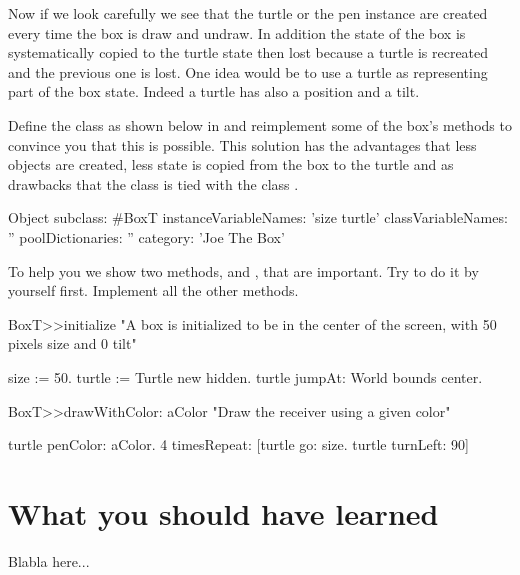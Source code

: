 Now if we look carefully we see that the turtle or the pen instance
are created every time the box is draw and undraw.  In addition the
state of the box is systematically copied to the turtle state then
lost because a turtle is recreated and the previous one is lost.  One
idea would be to use a turtle as representing part of the box state.
Indeed a turtle has also a position and a tilt.  

Define the class  as shown below in
 and reimplement some of the box's
methods to convince you that this is possible. This solution has the
advantages that less objects are created, less state is copied from
the box to the turtle and as drawbacks that the class  is tied
with the class .

\begin{classdef}\label{cls:alternateBoxDefinition}
Object subclass: #BoxT
   instanceVariableNames: 'size turtle'
   classVariableNames: ''
   poolDictionaries: ''
   category: 'Joe The Box'
\end{classdef}


To help you we show two methods,  and 
, that are important. Try to do it by 
yourself first. Implement all the other methods. 


\begin{method}\label{mt:boxAlternateInitialize}
BoxT>>initialize
   "A box is initialized to be in the center of the screen, with 
   50 pixels size and 0 tilt"
   
   size := 50.
   turtle := Turtle new hidden.
   turtle jumpAt: World bounds center.
\end{method}

\begin{method}\label{mt:alternateDrawWith}
BoxT>>drawWithColor: aColor 
   "Draw the receiver using a given color"
	
   turtle penColor: aColor.
   4 timesRepeat: [turtle go: size.
                  turtle turnLeft: 90]
\end{method}




\section{What you should have learned}
Blabla here...







\ifx\wholebook\relax\else
\fi
